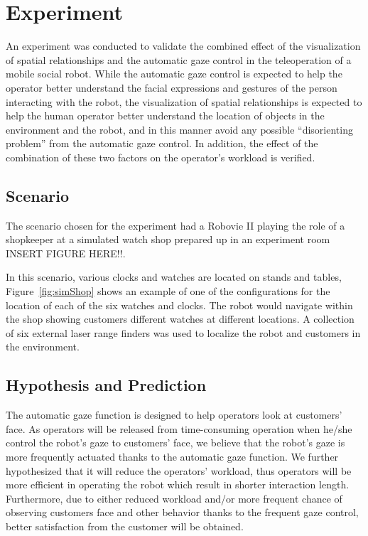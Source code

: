 \documentclass[journal]{IEEEtran}
\begin{document}
\section{Experiment}
\label{sec:experiment}
An experiment was conducted to validate the combined effect of the visualization of spatial relationships and the automatic gaze control in the teleoperation of a mobile social robot.
While the automatic gaze control is expected to help the operator better understand the facial expressions and gestures of the person interacting with the robot, the visualization of spatial relationships is expected to help the human operator better understand the location of objects in the environment and the robot, and in this manner avoid any possible ``disorienting problem'' from the automatic gaze control.
In addition, the effect of the combination of these two factors on the operator's workload is verified.

\subsection{Scenario}
The scenario chosen for the experiment had a Robovie II playing the role of a shopkeeper at a simulated watch shop prepared up in an experiment room INSERT FIGURE HERE!!.

In this scenario, various clocks and watches are located on stands and tables, Figure~\ref{fig:simShop} shows an example of one of the configurations for the location of each of the six watches and clocks.
The robot would navigate within the shop showing customers different watches at different locations. A collection of six external laser range finders was used to localize the robot and customers in the environment.

\subsection{Hypothesis and Prediction}
\label{sec:hypothesis}
The automatic gaze function is designed to help operators look at customers' face.
As operators will be released from time-consuming operation when he/she control the robot's gaze to customers' face, we believe that the robot's gaze is more frequently actuated thanks to the automatic gaze function. 
We further hypothesized that it will reduce the operators' workload, thus operators will be more efficient in operating the robot which result in shorter interaction length. 
Furthermore, due to either reduced workload and/or more frequent chance of observing customers face and other behavior thanks to the frequent gaze control, better satisfaction from the customer will be obtained. 
\end{document}
